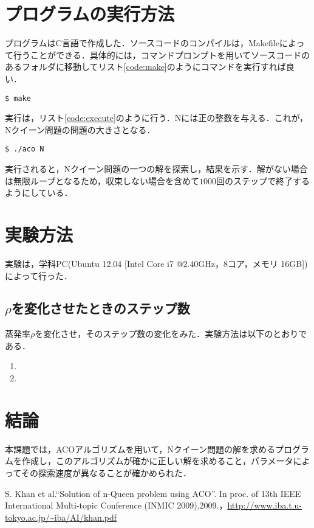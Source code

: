 \documentclass{jarticle}
\begin{document}
\section{プログラムの実行方法}
プログラムはC言語で作成した．ソースコードのコンパイルは，Makefileによって行うことができる．具体的には，コマンドプロンプトを用いてソースコードのあるフォルダに移動してリスト\ref{code:make}のようにコマンドを実行すれば良い．
\lstset{style=customplain}
\begin{lstlisting}[caption={make},label=code:make]
$ make
\end{lstlisting}

実行は，リスト\ref{code:execute}のように行う．Nには正の整数を与える．これが，Nクイーン問題の問題の大きさとなる．
\begin{lstlisting}[caption={実行},label=code:execute]
$ ./aco N
\end{lstlisting}

実行されると，Nクイーン問題の一つの解を探索し，結果を示す．解がない場合は無限ループとなるため，収束しない場合を含めて$1000$回のステップで終了するようにしている．



\section{実験方法}
実験は，学科PC(Ubuntu 12.04 [Intel Core i7 @2.40GHz，8コア，メモリ 16GB]) によって行った．

\subsection{$\rho$を変化させたときのステップ数}
蒸発率$\rho$を変化させ，そのステップ数の変化をみた．実験方法は以下のとおりである．
\begin{enumerate}
	\item 
	\item 
\end{enumerate}


\section{結論}
本課題では，ACOアルゴリズムを用いて，Nクイーン問題の解を求めるプログラムを作成し，このアルゴリズムが確かに正しい解を求めること，パラメータによってその探索速度が異なることが確かめられた．




\begin{thebibliography}{n}
S. Khan et al.“Solution of n-Queen problem using ACO”. In proc. of 13th IEEE International Multi-topic Conference (INMIC 2009),2009.，\url{http://www.iba.t.u-tokyo.ac.jp/~iba/AI/khan.pdf}


\end{thebibliography}
\end{document}
